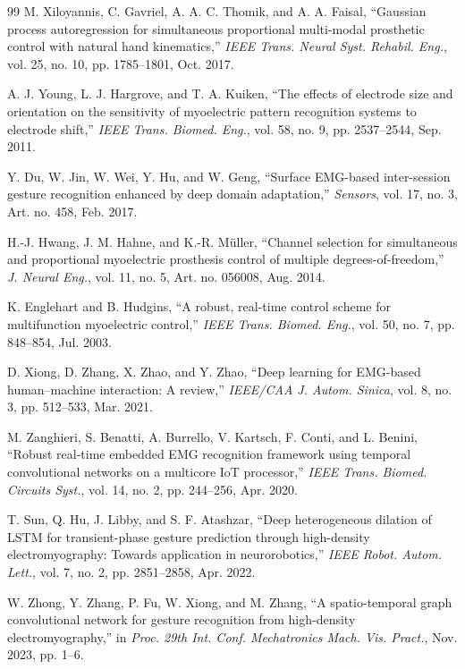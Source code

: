 \documentclass[journal]{IEEEtran}
\begin{document}
\begin{thebibliography}{99}
M. Xiloyannis, C. Gavriel, A. A. C. Thomik, and A. A. Faisal,
``Gaussian process autoregression for simultaneous proportional multi-modal prosthetic control with natural hand kinematics,''
\emph{IEEE Trans. Neural Syst. Rehabil. Eng.}, vol. 25, no. 10, pp. 1785--1801, Oct. 2017.

A. J. Young, L. J. Hargrove, and T. A. Kuiken,
``The effects of electrode size and orientation on the sensitivity of myoelectric pattern recognition systems to electrode shift,''
\emph{IEEE Trans. Biomed. Eng.}, vol. 58, no. 9, pp. 2537--2544, Sep. 2011.

Y. Du, W. Jin, W. Wei, Y. Hu, and W. Geng,
``Surface EMG-based inter-session gesture recognition enhanced by deep domain adaptation,''
\emph{Sensors}, vol. 17, no. 3, Art. no. 458, Feb. 2017.

H.-J. Hwang, J. M. Hahne, and K.-R. M{\"u}ller,
``Channel selection for simultaneous and proportional myoelectric prosthesis control of multiple degrees-of-freedom,''
\emph{J. Neural Eng.}, vol. 11, no. 5, Art. no. 056008, Aug. 2014.

K. Englehart and B. Hudgins,
``A robust, real-time control scheme for multifunction myoelectric control,''
\emph{IEEE Trans. Biomed. Eng.}, vol. 50, no. 7, pp. 848--854, Jul. 2003.

D. Xiong, D. Zhang, X. Zhao, and Y. Zhao,
``Deep learning for EMG-based human--machine interaction: A review,''
\emph{IEEE/CAA J. Autom. Sinica}, vol. 8, no. 3, pp. 512--533, Mar. 2021.

M. Zanghieri, S. Benatti, A. Burrello, V. Kartsch, F. Conti, and L. Benini,
``Robust real-time embedded EMG recognition framework using temporal convolutional networks on a multicore IoT processor,''
\emph{IEEE Trans. Biomed. Circuits Syst.}, vol. 14, no. 2, pp. 244--256, Apr. 2020.

T. Sun, Q. Hu, J. Libby, and S. F. Atashzar,
``Deep heterogeneous dilation of LSTM for transient-phase gesture prediction through high-density electromyography: Towards application in neurorobotics,''
\emph{IEEE Robot. Autom. Lett.}, vol. 7, no. 2, pp. 2851--2858, Apr. 2022.

W. Zhong, Y. Zhang, P. Fu, W. Xiong, and M. Zhang,
``A spatio-temporal graph convolutional network for gesture recognition from high-density electromyography,''
in \emph{Proc. 29th Int. Conf. Mechatronics Mach. Vis. Pract.}, Nov. 2023, pp. 1--6.


\end{thebibliography}
\end{document}
